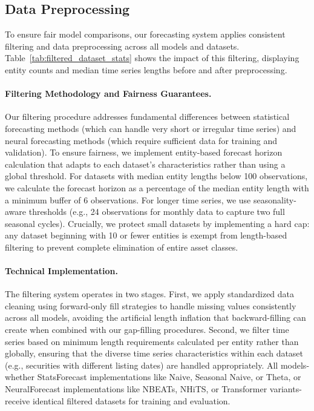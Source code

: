 \documentclass{article}
\begin{document}
\subsection{Data Preprocessing}

To ensure fair model comparisons, our forecasting system applies consistent filtering and data preprocessing across all models and datasets. Table~\ref{tab:filtered_dataset_stats} shows the impact of this filtering, displaying entity counts and median time series lengths before and after preprocessing. 

\paragraph{Filtering Methodology and Fairness Guarantees.} Our filtering procedure addresses fundamental differences between statistical forecasting methods (which can handle very short or irregular time series) and neural forecasting methods (which require sufficient data for training and validation). To ensure fairness, we implement entity-based forecast horizon calculation that adapts to each dataset's characteristics rather than using a global threshold. For datasets with median entity lengths below 100 observations, we calculate the forecast horizon as a percentage of the median entity length with a minimum buffer of 6 observations. For longer time series, we use seasonality-aware thresholds (e.g., 24 observations for monthly data to capture two full seasonal cycles). Crucially, we protect small datasets by implementing a hard cap: any dataset beginning with 10 or fewer entities is exempt from length-based filtering to prevent complete elimination of entire asset classes.

\paragraph{Technical Implementation.} The filtering system operates in two stages. First, we apply standardized data cleaning using forward-only fill strategies to handle missing values consistently across all models, avoiding the artificial length inflation that backward-filling can create when combined with our gap-filling procedures. Second, we filter time series based on minimum length requirements calculated per entity rather than globally, ensuring that the diverse time series characteristics within each dataset (e.g., securities with different listing dates) are handled appropriately. All models-whether StatsForecast implementations like Naive, Seasonal Naive, or Theta, or NeuralForecast implementations like NBEATs, NHiTS, or Transformer variants-receive identical filtered datasets for training and evaluation.
\end{document}
